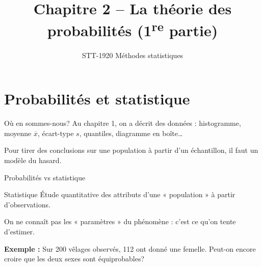 \documentclass{BeamerTemplate}
\title{Chapitre 2 -- La théorie des probabilités (1\textsuperscript{re} partie)}
\subtitle{STT-1920 Méthodes statistiques}
\date{}
\begin{document}
\begin{frame}[t]
  \titlepage
\end{frame}

\section{Probabilités et statistique}

\begin{frame}[t]{Où en sommes-nous?}
  Au chapitre 1, on a \alert{décrit} des données : histogramme, moyenne
  $\overline{x}$, écart-type $s$, quantiles, diagramme en boîte\ldots

  \medskip
  Pour tirer des conclusions sur une \alert{population} à partir d'un
  \alert{échantillon}, il faut un modèle du hasard.

  \bigskip
\end{frame}

\begin{frame}[t]{Probabilités vs statistique}
  \begin{Boite}{Statistique}
    Étude quantitative des attributs d'une « population » à partir
    d'observations.
  \end{Boite}
  On ne connaît pas les « paramètres » du phénomène : c'est ce qu'on tente
  d'estimer.

  \medskip
  \textbf{Exemple :} Sur 200 vêlages observés, 112 ont donné une femelle.
  Peut-on encore croire que les deux sexes sont équiprobables?

  \bigskip
\end{frame}

\end{document}
